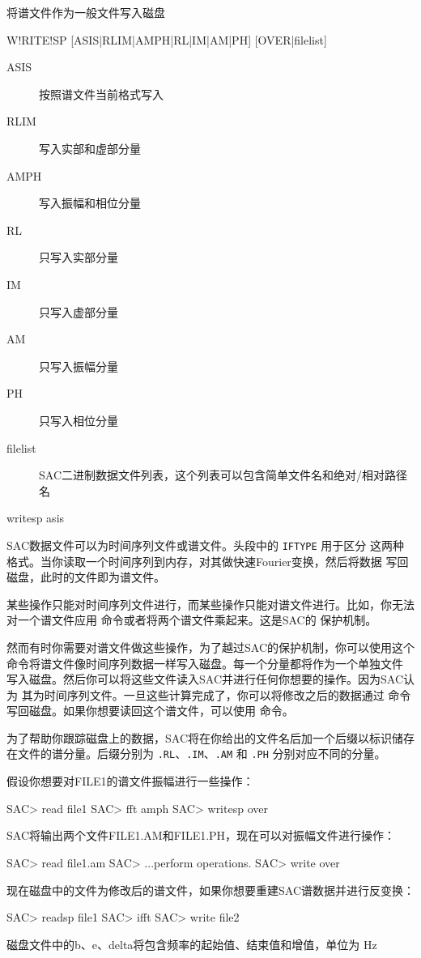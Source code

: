 \label{cmd:writesp}

将谱文件作为一般文件写入磁盘

\begin{SACSTX}
W!RITE!SP [ASIS|RLIM|AMPH|RL|IM|AM|PH] [OVER|filelist]
\end{SACSTX}

\begin{description}
\item [ASIS] 按照谱文件当前格式写入
\item [RLIM] 写入实部和虚部分量
\item [AMPH] 写入振幅和相位分量
\item [RL] 只写入实部分量
\item [IM] 只写入虚部分量
\item [AM] 只写入振幅分量
\item [PH] 只写入相位分量
\item [filelist]  SAC二进制数据文件列表，这个列表可以包含简单文件名和绝对/相对路径名
\end{description}

\begin{SACDFT}
writesp asis
\end{SACDFT}

SAC数据文件可以为时间序列文件或谱文件。头段中的 \texttt{IFTYPE} 用于区分
这两种格式。当你读取一个时间序列到内存，对其做快速Fourier变换，然后将数据
写回磁盘，此时的文件即为谱文件。

某些操作只能对时间序列文件进行，而某些操作只能对谱文件进行。比如，你无法
对一个谱文件应用  命令或者将两个谱文件乘起来。这是SAC的
保护机制。

然而有时你需要对谱文件做这些操作，为了越过SAC的保护机制，你可以使用这个
命令将谱文件像时间序列数据一样写入磁盘。每一个分量都将作为一个单独文件
写入磁盘。然后你可以将这些文件读入SAC并进行任何你想要的操作。因为SAC认为
其为时间序列文件。一旦这些计算完成了，你可以将修改之后的数据通过
 命令写回磁盘。如果你想要读回这个谱文件，可以使用
 命令。

为了帮助你跟踪磁盘上的数据，SAC将在你给出的文件名后加一个后缀以标识储存
在文件的谱分量。后缀分别为 \texttt{.RL}、\texttt{.IM}、\texttt{.AM} 和
\texttt{.PH} 分别对应不同的分量。

假设你想要对FILE1的谱文件振幅进行一些操作：
\begin{SACCode}
SAC> read file1
SAC> fft amph
SAC> writesp over
\end{SACCode}

SAC将输出两个文件FILE1.AM和FILE1.PH，现在可以对振幅文件进行操作：
\begin{SACCode}
SAC> read file1.am
SAC> ...perform operations.
SAC> write over
\end{SACCode}

现在磁盘中的文件为修改后的谱文件，如果你想要重建SAC谱数据并进行反变换：
\begin{SACCode}
SAC> readsp file1
SAC> ifft
SAC> write file2
\end{SACCode}

磁盘文件中的b、e、delta将包含频率的起始值、结束值和增值，单位为 \si{Hz}
